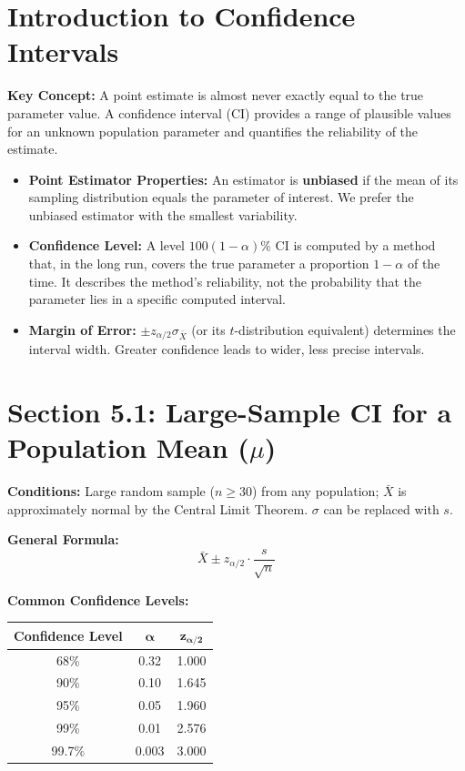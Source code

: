 \documentclass[11pt]{article}
\begin{document}
\section*{Introduction to Confidence Intervals}
\textbf{Key Concept:} A point estimate is almost never exactly equal to the true parameter value. A confidence interval (CI) provides a range of plausible values for an unknown population parameter and quantifies the reliability of the estimate.

\begin{itemize}[nosep]
    \item \textbf{Point Estimator Properties:} An estimator is \textbf{unbiased} if the mean of its sampling distribution equals the parameter of interest. We prefer the unbiased estimator with the smallest variability.
    \item \textbf{Confidence Level:} A level $100(1 - \alpha)\%$ CI is computed by a method that, in the long run, covers the true parameter a proportion $1 - \alpha$ of the time. It describes the method's reliability, not the probability that the parameter lies in a specific computed interval.
    \item \textbf{Margin of Error:} $\pm z_{\alpha/2} \sigma_{\bar{X}}$ (or its $t$-distribution equivalent) determines the interval width. Greater confidence leads to wider, less precise intervals.
\end{itemize}

\section*{Section 5.1: Large-Sample CI for a Population Mean ($\mu$)}
\textbf{Conditions:} Large random sample ($n \geq 30$) from any population; $\bar{X}$ is approximately normal by the Central Limit Theorem. $\sigma$ can be replaced with $s$.

\textbf{General Formula:}
\[\bar{X} \pm z_{\alpha/2} \cdot \frac{s}{\sqrt{n}}\]

\textbf{Common Confidence Levels:}
\begin{center}
\begin{tabular}{c|c|c}
\toprule
\textbf{Confidence Level} & $\bm{\alpha}$ & $\bm{z_{\alpha/2}}$ \\
\midrule
68\%  & 0.32 & 1.000 \\
90\%  & 0.10 & 1.645 \\
95\%  & 0.05 & 1.960 \\
99\%  & 0.01 & 2.576 \\
99.7\% & 0.003 & 3.000 \\
\bottomrule
\end{tabular}
\end{center}
\end{document}
